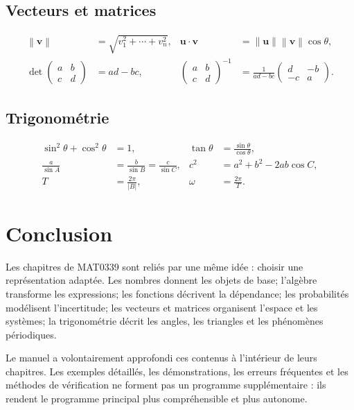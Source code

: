 \documentclass[12pt,a4paper,openany]{book}
\newcommand{\norm}[1]{\left\lVert #1\right\rVert}
\newcommand{\abs}[1]{\left\lvert #1\right\rvert}
\begin{document}
\section*{Vecteurs et matrices}
\begin{align*}
\norm{\mathbf v}&=\sqrt{v_1^2+\cdots+v_n^2},
&\mathbf u\cdot\mathbf v&=\norm{\mathbf u}\norm{\mathbf v}\cos\theta,\\
\det\begin{pmatrix}a&b\\c&d\end{pmatrix}&=ad-bc,
&\begin{pmatrix}a&b\\c&d\end{pmatrix}^{-1}
&=\frac1{ad-bc}\begin{pmatrix}d&-b\\-c&a\end{pmatrix}.
\end{align*}

\section*{Trigonométrie}
\begin{align*}
\sin^2\theta+\cos^2\theta&=1,
&\tan\theta&=\frac{\sin\theta}{\cos\theta},\\
\frac{a}{\sin A}&=\frac{b}{\sin B}=\frac{c}{\sin C},
&c^2&=a^2+b^2-2ab\cos C,\\
T&=\frac{2\pi}{\abs B},
&\omega&=\frac{2\pi}{T}.
\end{align*}

\chapter*{Conclusion}
Les chapitres de MAT0339 sont reliés par une même idée : choisir une représentation adaptée. Les nombres donnent les objets de base; l'algèbre transforme les expressions; les fonctions décrivent la dépendance; les probabilités modélisent l'incertitude; les vecteurs et matrices organisent l'espace et les systèmes; la trigonométrie décrit les angles, les triangles et les phénomènes périodiques.

Le manuel a volontairement approfondi ces contenus à l'intérieur de leurs chapitres. Les exemples détaillés, les démonstrations, les erreurs fréquentes et les méthodes de vérification ne forment pas un programme supplémentaire : ils rendent le programme principal plus compréhensible et plus autonome.
\end{document}
